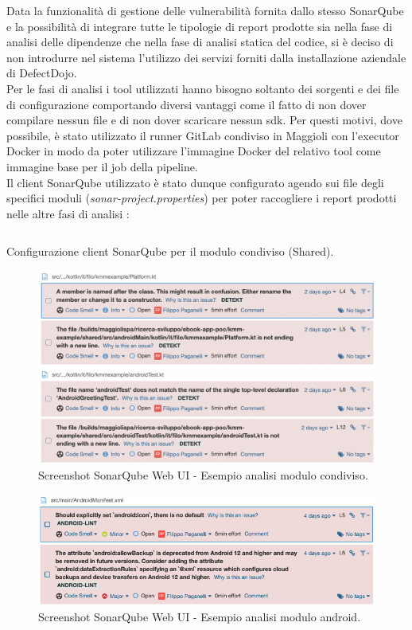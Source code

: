 Data la funzionalità di gestione delle vulnerabilità fornita dallo stesso SonarQube e la possibilità di integrare tutte le tipologie di report prodotte sia nella fase di analisi delle dipendenze che nella fase di analisi statica del codice, si è deciso di non introdurre nel sistema l'utilizzo dei servizi forniti dalla installazione aziendale di DefectDojo.\\
Per le fasi di analisi i tool utilizzati hanno bisogno soltanto dei sorgenti e dei file di configurazione comportando diversi vantaggi come il fatto di non dover compilare nessun file e di non dover scaricare nessun sdk. Per questi motivi, dove possibile, è stato utilizzato il runner GitLab condiviso in Maggioli con l'executor Docker in modo da poter utilizzare l'immagine Docker del relativo tool come immagine base per il job della pipeline.\\
Il client SonarQube utilizzato è stato dunque configurato agendo sui file degli specifici moduli (\textit{sonar-project.properties}) per poter raccogliere i report prodotti nelle altre fasi di analisi :
\begin{listing}[H]
\inputminted{kotlin}{code/4-sonarplugin}
\caption{Configurazione client SonarQube per il modulo condiviso (Shared).}
\end{listing}
\begin{figure}[H]
\centering
\includegraphics[width=1\textwidth]{img/Screenshot 2022-06-19 at 15.33.37.png}
\caption{Screenshot SonarQube Web UI - Esempio analisi modulo condiviso.}
\end{figure}
\begin{figure}[H]
\centering
\includegraphics[width=1\textwidth]{img/Screenshot 2022-06-21 at 09.58.58.png}
\caption{Screenshot SonarQube Web UI - Esempio analisi modulo android.}
\end{figure}

